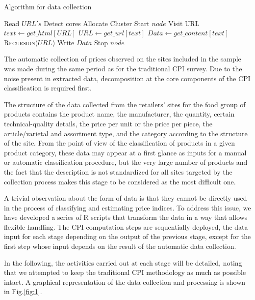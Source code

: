 \documentclass[]{article}
\begin{document}
\begin{algorithm}[h]
	\caption{Algorithm for data collection}
	\label{alg:dc}
	\begin{algorithmic}
		\State Read $URL's$
		\State Detect cores
		\State Allocate Cluster
		 \State Start $node$
		 			\State\Return
		 		\Else
		 			\State Visit URL
		 			\State $text \gets get\_html[URL]$
		 			\State $URL  \gets get\_url[text]$
		 			\State $Data \gets get\_content[text]$
		 			\State \Return \textsc{Recursion}{($URL$)}
		 		\EndIf
			\State Write $Data$
			\EndProcedure
		  \State Stop $node$
		\EndFor	
	\end{algorithmic}
\end{algorithm}




The automatic collection of prices observed on the sites included in the sample was made during
the same period as for the traditional CPI survey. Due to the noise present in extracted data, decomposition at the core components of the CPI classification is required first.


The structure of the data collected from the retailers’ sites for the food group of products contains the product 
name, the manufacturer, the quantity, certain technical-quality details, the price per unit or the price per piece, 
the article/varietal and assortment type, and the category according to the structure of the site. From the point of view 
of the classification of products in a given product category, these data may appear at a first glance 
as inputs for a manual or automatic classification procedure, but the very large number of products and the fact 
that the description is not standardized for all sites targeted by the collection process makes this stage to be considered as the most difficult one.

A trivial observation about the form of data is that they cannot be directly used in the process of classifying 
and estimating price indices. To address this issue, we have developed a series of R scripts that transform 
the data in a way that allows flexible handling. The CPI computation steps are sequentially deployed, the data 
input for each stage depending on the output of the previous stage, except for the first step whose input depends 
on the result of the automatic data collection.


In the following, the activities carried out at each stage will be detailed, noting that we attempted to keep the 
traditional CPI methodology as much as possible intact. A graphical representation of the data collection and processing is shown in Fig.\ref{fig:1}.
\end{document}
